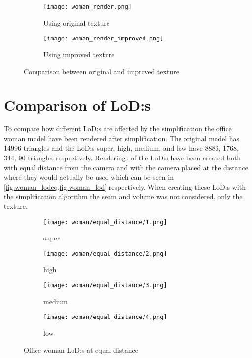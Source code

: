 \begin{figure}[ht]
  \centering
  \begin{subfigure}[b]{.15\textwidth}
    \texttt{[image: woman\_render.png]}
    \caption{Using original texture}
    \label{fig:using_original_texture}
  \end{subfigure}
  \qquad
  \begin{subfigure}[b]{.15\textwidth}
    \texttt{[image: woman\_render\_improved.png]}
    \caption{Using improved texture}
    \label{fig:using_improved_texture}
  \end{subfigure}
  \caption{Comparison between original and improved texture}
  \label{fig:texture_comparison}
\end{figure}

\clearpage

\section{Comparison of LoD:s}

To compare how different LoD:s are affected by the simplification the office woman model have been rendered after simplification. The original model has 14996 triangles and the LoD:s super, high, medium, and low have 8886, 1768, 344, 90 triangles respectively. Renderings of the LoD:s have been created both with equal distance from the camera and with the camera placed at the distance where they would actually be used which can be seen in \cref{fig:woman_lodeq,fig:woman_lod} respectively. When creating these LoD:s with the simplification algorithm the seam and volume was not considered, only the texture.

\begin{figure}[ht]
  \centering
  \begin{subfigure}[b]{.22\textwidth}
    \texttt{[image: woman/equal\_distance/1.png]}
    \caption{super}
    \label{fig:womaneq0}
  \end{subfigure}
  \begin{subfigure}[b]{.22\textwidth}
    \texttt{[image: woman/equal\_distance/2.png]}
    \caption{high}
    \label{fig:womaneq1}
  \end{subfigure}
  \centering
  \begin{subfigure}[b]{.22\textwidth}
    \texttt{[image: woman/equal\_distance/3.png]}
    \caption{medium}
    \label{fig:womaneq2}
  \end{subfigure}
  \begin{subfigure}[b]{.22\textwidth}
    \texttt{[image: woman/equal\_distance/4.png]}
    \caption{low}
    \label{fig:womaneq3}
  \end{subfigure}
  \caption{Office woman LoD:s at equal distance}
  \label{fig:woman_lodeq}
\end{figure}

